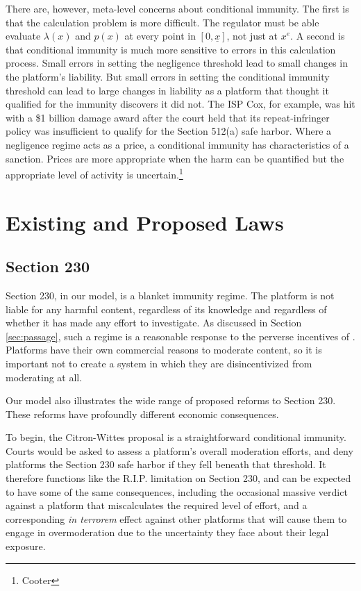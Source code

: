 There are, however, meta-level concerns about conditional immunity. The first is that the calculation problem is more difficult. The regulator must be able evaluate $\lambda(x)$ and $p(x)$ at every point in $[0, \underline{x}]$, not just at $x^e$. A second is that conditional immunity is much more sensitive to errors in this calculation process. Small errors in setting the negligence threshold lead to small changes in the platform's liability. But small errors in setting the conditional immunity threshold can lead to large changes in liability as a platform that thought it qualified for the immunity discovers it did not. The ISP Cox, for example, was hit with a \$1 billion damage award after the court held that its repeat-infringer policy was insufficient to qualify for the Section 512(a) safe harbor. Where a negligence regime acts as a price, a conditional immunity has characteristics of a sanction. Prices are more appropriate when the harm can be quantified but the appropriate level of activity is uncertain.\footnote{Cooter}

\section{Existing and Proposed Laws}
\label{sec:laws}



\subsection{Section 230}

Section 230, in our model, is a blanket immunity regime. The platform is not liable for any harmful content, regardless of its knowledge and regardless of whether it has made any effort to investigate. As discussed in Section \ref{sec:passage}, such a regime is a reasonable response to the perverse incentives of . Platforms have their own commercial reasons to moderate content, so it is important not to create a system in which they are disincentivized from moderating at all.

Our model also illustrates the wide range of proposed reforms to Section 230. These reforms have profoundly different economic consequences.

To begin, the Citron-Wittes proposal is a straightforward conditional immunity. Courts would be asked to assess a platform's overall moderation efforts, and deny platforms the Section 230 safe harbor if they fell beneath that threshold. It therefore functions like the R.I.P. limitation on Section 230, and can be expected to have some of the same consequences, including the occasional massive verdict against a platform that miscalculates the required level of effort, and a corresponding \emph{in terrorem} effect against other platforms that will cause them to engage in overmoderation due to the uncertainty they face about their legal exposure.

